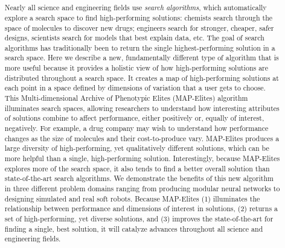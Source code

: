 \documentclass[twocolumn, DIV25, 9pt]{scrartcl}
\date{}
\title{\flushleft{\fontsize{21}{12}\selectfont \textsf{\textbf{Illuminating search spaces by mapping elites}}\\
  \textbf{\large{\textsf{
        Jean-Baptiste Mouret$\mathsf{^{1}}$ and 
        Jeff Clune$\mathsf{^{2}}$}}}\\
  ~\\
         \small{
           $\mathsf{^1}$Universit\'e Pierre et Marie Curie-Paris 6, CNRS UMR 7222, France\\
           $\mathsf{^2}$University of Wyoming, USA\\
}}
\noindent{\normalsize \textsf{Preprint -- \today}}
\vspace*{-1.5cm}
}
\begin{document}
\maketitle

\thispagestyle{fancy}
\pagestyle{fancy}


\begin{abstract}
\sffamily \bfseries 

Nearly all science and engineering fields use \emph{search algorithms}, which automatically explore a search space to find high-performing solutions: chemists search through the space of molecules to discover new drugs; engineers search for stronger, cheaper, safer designs, scientists search for models that best explain data, etc. The goal of search algorithms has traditionally been to return the single highest-performing solution in a search space. Here we describe a new, fundamentally different type of algorithm that is more useful because it provides a holistic view of how high-performing solutions are distributed throughout a search space. It creates a map of high-performing solutions at each point in a space defined by dimensions of variation that a user gets to choose. This Multi-dimensional Archive of Phenotypic Elites (MAP-Elites) algorithm illuminates search spaces, allowing researchers to understand how interesting attributes of solutions combine to affect performance, either positively or, equally of interest, negatively. For example, a drug company may wish to understand how performance changes as the size of molecules and their cost-to-produce vary.  MAP-Elites produces a large diversity of high-performing, yet qualitatively different solutions, which can be more helpful than a single, high-performing solution. Interestingly, because MAP-Elites explores more of the search space, it also tends to find a better overall solution than state-of-the-art search algorithms. We demonstrate the benefits of this new algorithm in three different problem domains ranging from producing modular neural networks to designing simulated and real soft robots. Because MAP-Elites (1) illuminates the relationship between performance and dimensions of interest in solutions, (2) returns a set of high-performing, yet diverse solutions, and (3) improves the state-of-the-art for finding a single, best solution, it will catalyze advances throughout all science and engineering fields.
\end{abstract}
\end{document}
